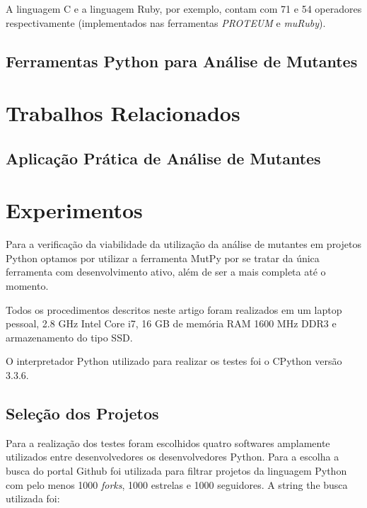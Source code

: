 \documentclass[12pt]{article}
\begin{document}
A linguagem C e a linguagem Ruby, por exemplo, contam com 71 \cite{Delamaro:1996} e 
54 operadores respectivamente \cite{Li:2015} (implementados nas 
ferramentas \textit{PROTEUM} e \textit{muRuby}).

\subsection{Ferramentas Python para Análise de Mutantes}




\section{Trabalhos Relacionados}

\subsection{Aplicação Prática de Análise de Mutantes}

\section{Experimentos}

Para a verificação da viabilidade da utilização da análise
de mutantes em projetos Python optamos por utilizar a 
ferramenta MutPy por se tratar da única ferramenta com
desenvolvimento ativo, além de ser a mais completa até o
momento.

Todos os procedimentos descritos neste artigo foram realizados
em um laptop pessoal, 2.8 GHz Intel Core i7, 16 GB de memória
RAM 1600 MHz DDR3 e armazenamento do tipo SSD.

O interpretador Python utilizado para realizar os testes foi o
CPython versão 3.3.6.

\subsection{Seleção dos Projetos}

Para a realização dos testes foram escolhidos quatro softwares
amplamente utilizados entre desenvolvedores os desenvolvedores
Python. Para a escolha a busca do portal Github\footnotemark 
foi utilizada para filtrar projetos da linguagem Python 
com pelo menos 1000 \textit{ forks}, 1000 estrelas e 1000 
seguidores. A string the busca utilizada foi:

\end{document}
